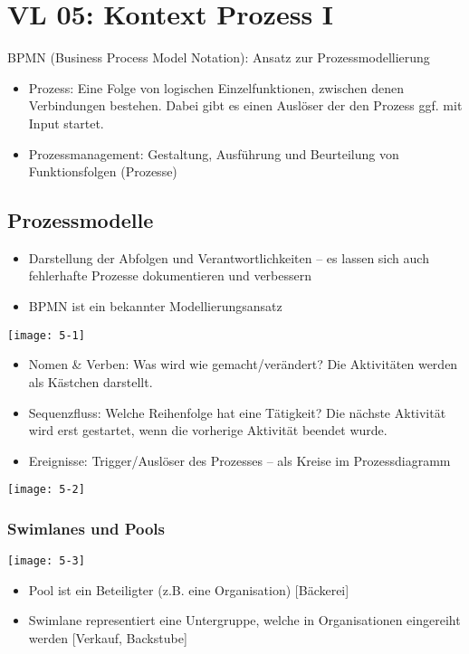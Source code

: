 \section{VL 05: Kontext Prozess I}

BPMN (Business Process Model Notation): Ansatz zur Prozessmodellierung

\begin{itemize}
  \item Prozess: Eine Folge von logischen Einzelfunktionen, zwischen denen Verbindungen bestehen. Dabei gibt es einen Auslöser der den Prozess ggf. mit Input startet.
  \item Prozessmanagement: Gestaltung, Ausführung und Beurteilung von Funktionsfolgen (Prozesse)
\end{itemize}


\subsection{Prozessmodelle}

\begin{itemize}
  \item Darstellung der Abfolgen und Verantwortlichkeiten – es lassen sich auch fehlerhafte Prozesse dokumentieren und verbessern
  \item BPMN ist ein bekannter Modellierungsansatz
\end{itemize}

\texttt{[image: 5-1]}

\begin{itemize}
  \item Nomen \& Verben: Was wird wie gemacht/verändert? Die Aktivitäten werden als Kästchen darstellt.
  \item Sequenzfluss: Welche Reihenfolge hat eine Tätigkeit? Die nächste Aktivität wird erst gestartet, wenn die vorherige Aktivität beendet wurde.
  \item Ereignisse: Trigger/Auslöser des Prozesses – als Kreise im Prozessdiagramm
\end{itemize}

\texttt{[image: 5-2]}


\subsubsection{Swimlanes und Pools}

\texttt{[image: 5-3]}

\begin{itemize}
  \item Pool ist ein Beteiligter (z.B. eine Organisation) [Bäckerei]
  \item Swimlane representiert eine Untergruppe, welche in Organisationen eingereiht werden [Verkauf, Backstube]
\end{itemize}


